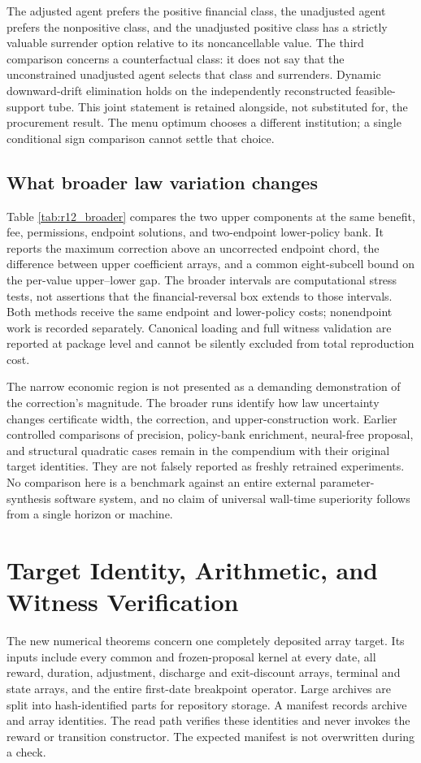 The adjusted agent prefers the positive financial class, the unadjusted agent prefers the nonpositive class, and the unadjusted positive class has a strictly valuable surrender option relative to its noncancellable value. The third comparison concerns a counterfactual class: it does not say that the unconstrained unadjusted agent selects that class and surrenders. Dynamic downward-drift elimination holds on the independently reconstructed feasible-support tube. This joint statement is retained alongside, not substituted for, the procurement result. The menu optimum chooses a different institution; a single conditional sign comparison cannot settle that choice.

\subsection{What broader law variation changes}


Table \ref{tab:r12_broader} compares the two upper components at the same benefit, fee, permissions, endpoint solutions, and two-endpoint lower-policy bank. It reports the maximum correction above an uncorrected endpoint chord, the difference between upper coefficient arrays, and a common eight-subcell bound on the per-value upper--lower gap. The broader intervals are computational stress tests, not assertions that the financial-reversal box extends to those intervals. Both methods receive the same endpoint and lower-policy costs; nonendpoint work is recorded separately. Canonical loading and full witness validation are reported at package level and cannot be silently excluded from total reproduction cost.

The narrow economic region is not presented as a demanding demonstration of the correction's magnitude. The broader runs identify how law uncertainty changes certificate width, the correction, and upper-construction work. Earlier controlled comparisons of precision, policy-bank enrichment, neural-free proposal, and structural quadratic cases remain in the compendium with their original target identities. They are not falsely reported as freshly retrained experiments. No comparison here is a benchmark against an entire external parameter-synthesis software system, and no claim of universal wall-time superiority follows from a single horizon or machine.

\section{Target Identity, Arithmetic, and Witness Verification}
\label{sec:r12_verification}
The new numerical theorems concern one completely deposited array target. Its inputs include every common and frozen-proposal kernel at every date, all reward, duration, adjustment, discharge and exit-discount arrays, terminal and state arrays, and the entire first-date breakpoint operator. Large archives are split into hash-identified parts for repository storage. A manifest records archive and array identities. The read path verifies these identities and never invokes the reward or transition constructor. The expected manifest is not overwritten during a check.

